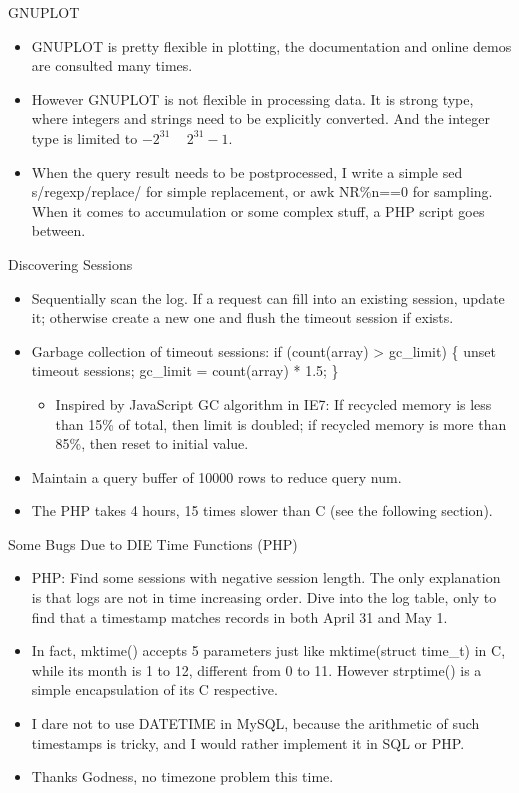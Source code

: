 \documentclass{beamer}
\begin{document}
\begin{frame}{GNUPLOT}
\begin{itemize}
  \item GNUPLOT is pretty flexible in plotting, the documentation and online demos are consulted many times.
  \item However GNUPLOT is not flexible in processing data. It is strong type, where integers and strings need to be explicitly converted. And the integer type is limited to $-2^{31}$ ~ $2^{31}-1$.
  \item When the query result needs to be postprocessed, I write a simple sed  s/regexp/replace/ for simple replacement, or awk NR\%n==0 for sampling. When it comes to accumulation or some complex stuff, a PHP script goes between.
\end{itemize}
\end{frame}

\begin{frame}{Discovering Sessions}
\begin{itemize}
  \item Sequentially scan the log. If a request can fill into an existing session, update it; otherwise create a new one and flush the timeout session if exists.
  \item Garbage collection of timeout sessions: if (count(array) > gc\_limit) \{ unset timeout sessions; gc\_limit = count(array) * 1.5; \}
  \begin{itemize}
    \item Inspired by JavaScript GC algorithm in IE7: If recycled memory is less than 15\% of total, then limit is doubled; if recycled memory is more than 85\%, then reset to initial value.
  \end{itemize}
  \item Maintain a query buffer of 10000 rows to reduce query num.
  \item The PHP takes 4 hours, 15 times slower than C (see the following section).
\end{itemize}
\end{frame}

\begin{frame}{Some Bugs Due to DIE Time Functions (PHP)}
\begin{itemize}
  \item PHP: Find some sessions with negative session length. The only explanation is that logs are not in time increasing order. Dive into the log table, only to find that a timestamp matches records in both April 31 and May 1.
  \item In fact, mktime() accepts 5 parameters just like mktime(struct time\_t) in C, while its month is 1 to 12, different from 0 to 11. However strptime() is a simple encapsulation of its C respective.
  \item I dare not to use DATETIME in MySQL, because the arithmetic of such timestamps is tricky, and I would rather implement it in SQL or PHP.
  \item Thanks Godness, no timezone problem this time.
\end{itemize}
\end{frame}
\end{document}
